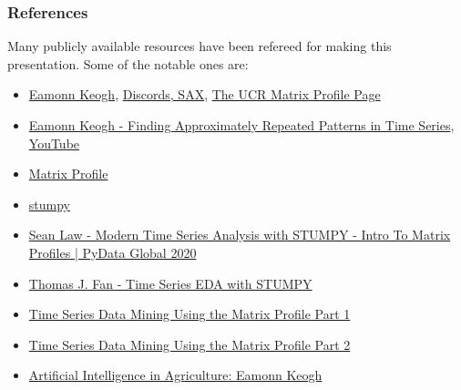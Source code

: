 \begin{frame}\frametitle{References}
Many publicly available resources have been refereed for making this presentation. Some of the notable ones are:
\footnotesize
\begin{itemize}
        \item \href{https://www.cs.ucr.edu/~eamonn/}{Eamonn Keogh}, \href{https://www.cs.ucr.edu/~eamonn/discords/}{Discords, SAX}, \href{https://www.cs.ucr.edu/~eamonn/MatrixProfile.html}{The UCR Matrix Profile Page}
        \item \href{https://www.youtube.com/watch?v=BYjOp2NoDdc}{Eamonn Keogh - Finding Approximately Repeated Patterns in Time Series}, \href{https://www.youtube.com/@eamonnkeogh/videos}{YouTube}
        \item \href{https://www.cs.ucr.edu/~eamonn/MatrixProfile.html}{Matrix Profile}
        \item \href{https://github.com/TDAmeritrade/stumpy}{stumpy}
        \item \href{https://www.youtube.com/watch?app=desktop&v=T9_z7EpA8QM}{Sean Law - Modern Time Series Analysis with STUMPY - Intro To Matrix Profiles | PyData Global 2020}
        \item \href{https://www.youtube.com/watch?app=desktop&v=kCOm0VtC8c8}{Thomas J. Fan - Time Series EDA with STUMPY}
        \item \href{https://www.youtube.com/watch?v=1ZHW977t070}{Time Series Data Mining Using the Matrix Profile Part 1}
        \item \href{https://www.youtube.com/watch?v=LnQneYvg84M}{Time Series Data Mining Using the Matrix Profile Part 2}
        \item \href{https://www.youtube.com/watch?v=UBi_csBcUVQ}{Artificial Intelligence in Agriculture: Eamonn Keogh}

\end{itemize}
\end{frame}
